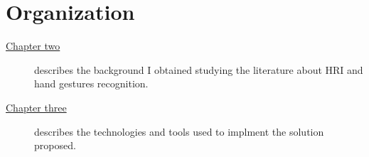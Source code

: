 \documentclass[../thesis.tex]{subfiles}
\begin{document}
\section{Organization}\label{s:organization}
\begin{description}
    \item[{\hyperref[cap:background]{Chapter two}}] describes the background I obtained studying the literature about \acrlong{HRI} and hand gestures recognition.
    \item[{\hyperref[cap:technologies-and-tools]{Chapter three}}] describes the technologies and tools used to implment the solution proposed.
\end{description}
\end{document}
